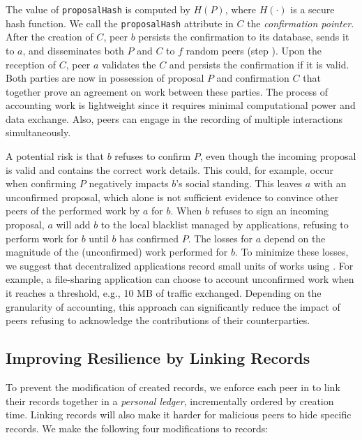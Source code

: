 The value of \texttt{proposalHash} is computed by $ H(P) $, where $ H(\cdot) $ is a secure hash function.
We call the \texttt{proposalHash} attribute in $ C $ the \emph{confirmation pointer}.
After the creation of $ C $, peer $ b $ persists the confirmation to its database, sends it to $ a $, and disseminates both $ P $ and $ C $ to $ f $ random peers (step ).
Upon the reception of $ C $, peer $ a $ validates the $ C $ and persists the confirmation if it is valid.
Both parties are now in possession of proposal $ P $ and confirmation $ C $ that together prove an agreement on work between these parties.
The process of accounting work is lightweight since it requires minimal computational power and data exchange. 
Also, peers can engage in the recording of multiple interactions simultaneously.

A potential risk is that $ b $ refuses to confirm $ P $, even though the incoming proposal is valid and contains the correct work details.
This could, for example, occur when confirming $ P $ negatively impacts $ b $'s social standing.
This leaves $ a $ with an unconfirmed proposal, which alone is not sufficient evidence to convince other peers of the performed work by $ a $ for $ b $.
When $ b $ refuses to sign an incoming proposal, $ a $ will add $ b $ to the local blacklist managed by applications, refusing to perform work for $ b $ until $ b $ has confirmed $ P $.
The losses for $ a $ depend on the magnitude of the (unconfirmed) work performed for $ b $.
To minimize these losses, we suggest that decentralized applications record small units of works using \ModelName{}.
For example, a file-sharing application can choose to account unconfirmed work when it reaches a threshold, e.g., 10 MB of traffic exchanged.
Depending on the granularity of accounting, this approach can significantly reduce the impact of peers refusing to acknowledge the contributions of their counterparties.

\subsection{Improving Resilience by Linking Records}
To prevent the modification of created records, we enforce each peer in \ModelName{} to link their records together in a \emph{personal ledger}, incrementally ordered by creation time.
Linking records will also make it harder for malicious peers to hide specific records.
We make the following four modifications to records:

